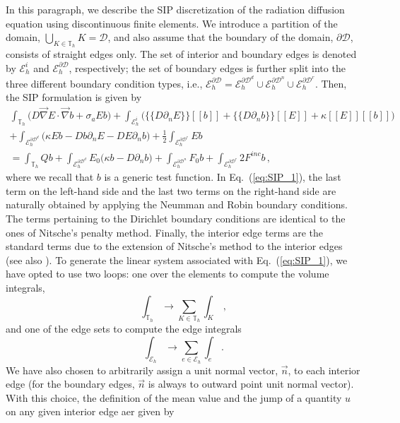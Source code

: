 \documentclass[preprint,10pt]{elsarticle}
\newcommand{\grad}{\vec{\nabla}}
\newcommand{\jmp}[1]{[\![#1]\!]}                     %
\newcommand{\mvl}[1]{\{\!\!\{#1\}\!\!\}}             %
\newcommand{\D}{\mathcal{D}}
\newcommand{\vn}{\vec{n}}
\newcommand{\EI}{\mathcal{E}_h^i}
\newcommand{\ED}{\mathcal{E}_h^{\partial \D^d}}
\newcommand{\EN}{\mathcal{E}_h^{\partial \D^n}}
\newcommand{\ER}{\mathcal{E}_h^{\partial \D^r}}
\newcommand{\eqt}[1]{Eq.~(\ref{#1})}                     %
\newcommand{\tf}{b}
\begin{document}
In this paragraph, we describe the SIP discretization \cite{Kanschat2007} of the 
radiation diffusion equation using discontinuous finite elements. 
We introduce a partition
of the domain, $\bigcup\nolimits_{K\in \mathbb{T}_{h}}K=\D$, and also assume
that the boundary of the domain, $\partial \D$, consists of straight edges only. The 
set of interior and boundary edges is denoted by $\EI$ and $\mathcal{E}_h^{\partial\D}$,
respectively; the set of boundary edges is further split into the three different boundary 
condition types, i.e., $\mathcal{E}_h^{\partial\D} = \ED \cup \EN \cup \ER$. 
Then, the SIP formulation is given by
\begin{multline}
\label{eq:SIP_1}
\int_{\mathbb{T}_{h}} \Big( D \grad E \cdot \grad \tf + \sigma_a E \tf \Big)
+ \int_{\EI} \Big( \mvl{D\partial_n E} \jmp{\tf}  + \mvl{D\partial_n \tf} \jmp{E} + \kappa\jmp{E}\jmp{\tf} \Big)
\\
+ \int_{\ED} \Big( \kappa E \tf -D\tf \partial_n E  -D E \partial_n \tf \Big)
+ \frac{1}{2} \int_{\ER}  E \tf  
\\
=
\int_{\mathbb{T}_{h}} Q \tf 
+ \int_{\ED} E_0 \Big( \kappa \tf  -D \partial_n \tf  \Big)
+ \int_{\EN} F_0 \tf  
+ \int_{\ER} 2 F^{inc} \tf  \, ,
\end{multline}
where we recall that $\tf$ is a generic test function. 
In \eqt{eq:SIP_1}, the last term on the left-hand side and the last two terms on the right-hand side 
are naturally obtained by applying the Neumman and Robin boundary conditions. The terms pertaining 
to the Dirichlet boundary conditions are identical to the ones of Nitsche's penalty method. 
Finally, the interior edge terms are the standard terms due to the extension of Nitsche's method to 
the interior edges (see also \cite{qqq}). To generate the linear system associated with \eqt{eq:SIP_1}, 
we have opted to use two loops: one over the elements to compute the volume integrals,
\begin{equation}
\int_{\mathbb{T}_{h}} \longrightarrow \sum_{K \in \mathbb{T}_{h}} \int_{K} \, ,
\end{equation}
and one of the edge sets to compute the edge integrals
\begin{equation}
\int_{\mathcal{E}_h} \longrightarrow \sum_{e \in \mathcal{E}_h} \int_{e} \, .
\end{equation}
We have also chosen to arbitrarily assign a unit normal vector, $\vn$, to each interior edge (for the boundary edges,
$\vn$ is always to outward point unit normal vector). With this choice, the definition of the mean value and the jump of a quantity $u$ on any given interior edge aer given by
\end{document}
